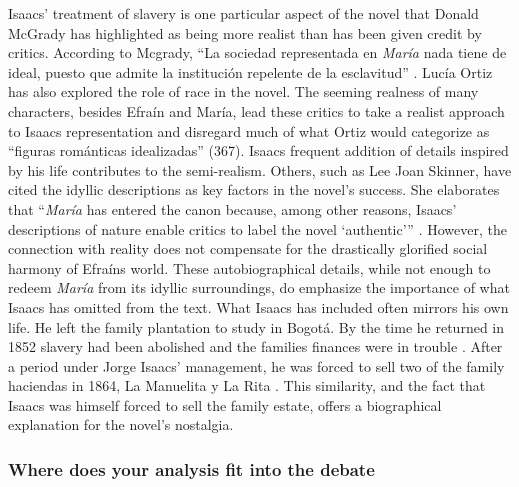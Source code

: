 \documentclass[12pt]{report}\usepackage[]{graphicx}\usepackage[]{color}
\begin{document}
\begin{spacing}{1.9}
Isaacs' treatment of slavery is one particular aspect of the novel that Donald McGrady has highlighted as being more realist than has been given credit by critics. 
According to Mcgrady, \enquote{La sociedad representada en \textit{María} nada tiene de ideal, puesto que admite la institución repelente de la esclavitud} \autocite[24]{McGrady2012}.
Lucía Ortiz has also explored the role of race in the novel. 
The seeming realness of many characters, besides Efraín and María, lead these critics to take a realist approach to Isaacs representation and disregard much of what Ortiz would categorize as \enquote{figuras románticas idealizadas} (367)\nocite{Ortiz2007}. 
Isaacs frequent addition of details inspired by his life contributes to the semi-realism. 
Others, such as Lee Joan Skinner, have cited the idyllic descriptions as key factors in the novel's success.
She elaborates that \enquote{\textit{María} has entered the canon because, among other reasons, Isaacs' descriptions of nature enable critics to label the novel \enquote{authentic}} \autocite[13]{Skinner2014}.
However, the connection with reality does not compensate for the drastically glorified social harmony of Efraíns world. 
These autobiographical details, while not enough to redeem \textit{María} from its idyllic surroundings, do emphasize the importance of what Isaacs has omitted from the text.
What Isaacs has included often mirrors his own life. He left the family plantation to study in Bogotá. By the time he returned in 1852 slavery had been abolished and the families finances were in trouble \autocite[145]{Jagoe2003}. 
After a period under Jorge Isaacs' management, he was forced to sell two of the family haciendas in 1864, La Manuelita y La Rita \autocite[261]{Mejia1976}.
This similarity, and the fact that Isaacs was himself forced to sell the family estate, offers a biographical explanation for the novel's nostalgia. 


\subsubsection{Where does your analysis fit into the debate}


\end{spacing}
\end{document}
